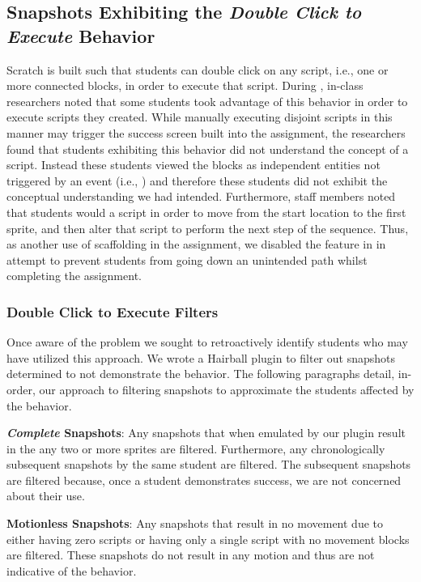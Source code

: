 \subsection{Snapshots Exhibiting the \emph{Double Click to Execute} Behavior}
Scratch is built such that students can double click on any script, i.e., one
or more connected blocks, in order to execute that script. During \sone{},
in-class researchers noted that some students took advantage of this behavior
in order to execute scripts they created. While manually executing disjoint
scripts in this manner may trigger the success screen built into the
assignment, the researchers found that students exhibiting this behavior did
not understand the concept of a script. Instead these students viewed the
blocks as independent entities not triggered by an event (i.e., \netclicked)
and therefore these students did not exhibit the conceptual understanding we
had intended. Furthermore, staff members noted that students would \dce{} a
script in order to move from the start location to the first sprite, and then
alter that script to perform the next step of the sequence. Thus, as another
use of scaffolding in the assignment, we disabled the \dce{} feature in \stwo{}
in attempt to prevent students from going down an unintended path whilst
completing the assignment.

\subsubsection{Double Click to Execute Filters}
Once aware of the problem we sought to retroactively identify students who may
have utilized this \dce{} approach. We wrote a Hairball plugin to filter out
snapshots determined to not demonstrate the \dce{} behavior. The following
paragraphs detail, in-order, our approach to filtering snapshots to approximate
the students affected by the \dce{} behavior.

\textbf{\emph{Complete} Snapshots}: Any snapshots that when emulated by our
plugin result in the \net{}  any two or more sprites are
filtered. Furthermore, any chronologically subsequent snapshots by the same
student are filtered. The subsequent snapshots are filtered because, once a
student demonstrates success, we are not concerned about their \dce{} use.

\textbf{Motionless Snapshots}: Any snapshots that result in no movement due to
either having zero scripts or having only a single \netclicked{} script with no
movement blocks are filtered. These snapshots do not result in any motion and
thus are not indicative of the \dce{} behavior.

